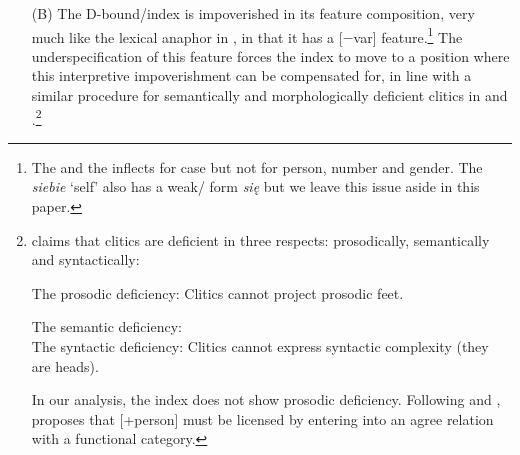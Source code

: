 \documentclass[output=paper,nonflat,colorlinks,citecolor=brown,newtxmath]{langsci/langscibook}
\begin{document}
\begin{itemize}
{\begin{itemize}
        \end{itemize} \label{ex:witkos:5d}}
    \z
    \z
    \item[(B)] The D-bound/index is impoverished in its feature composition, very much like the lexical anaphor in , in that it has a [$-$var] feature.\footnote{\label{fn4}The    and the  inflects for case but not for person, number and gender. The   \textit{siebie} ‘self’ also has a weak/ form \textit{się} but we leave this issue aside in this paper.} The underspecification of this feature forces the index to move to a position where this interpretive impoverishment can be compensated for, in line with a similar procedure for semantically and morphologically deficient  clitics in \cite{bejar2003} and \cite{franks2017,franks2018}.\footnote{\label{fn6}\cite{franks2017,franks2018} claims that clitics are deficient in three respects: prosodically, semantically and syntactically:

\ea
The prosodic deficiency: Clitics cannot project prosodic feet. \citep[147]{franks2017}
\z

\ea
The semantic deficiency:\\
\z
\z
\ea
The syntactic deficiency: Clitics cannot express syntactic complexity (they are heads).
\z

\noindent In our analysis, the index does not show prosodic deficiency. Following \cite{cardinalettistarke1994} and \cite{bejar2003}, \cite{franks2017} proposes that [+person] must be licensed by entering into an agree relation with a functional category.}


\end{itemize}
\end{document}

